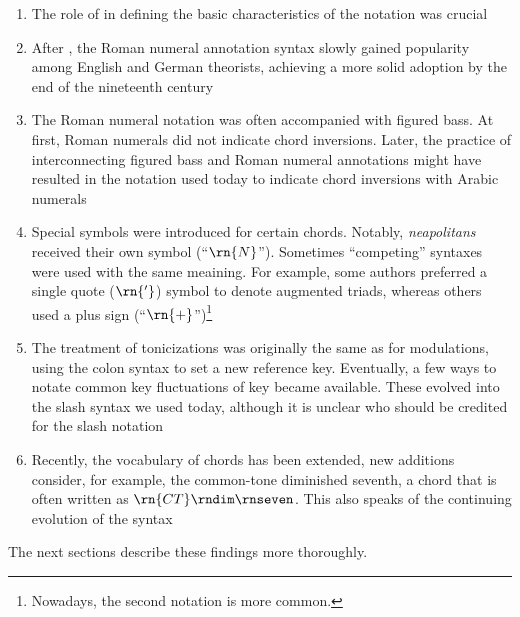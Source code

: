 \begin{enumerate}
    \item The role of \textcite{weber1817versuch} in
    defining the basic characteristics of the notation was
    crucial
    \item After \textcite{weber1817versuch}, the Roman
    numeral annotation syntax slowly gained popularity among
    English and German theorists, achieving a more solid
    adoption by the end of the nineteenth century
    \item The Roman numeral notation was often accompanied
    with figured bass. At first, Roman numerals did not
    indicate chord inversions. Later, the practice of
    interconnecting figured bass and Roman numeral
    annotations might have resulted in the notation used
    today to indicate chord inversions with Arabic numerals
    \item Special symbols were introduced for certain
    chords. Notably, \emph{neapolitans} received their own
    symbol (``$\rn{N}$''). Sometimes ``competing'' syntaxes
    were used with the same meaining. For example, some
    authors preferred a single quote ($\rn{'}$) symbol to
    denote augmented triads, whereas others used a plus sign
    (``$\rn{+}$'')\footnote{Nowadays, the second notation is
    more common.}
    \item The treatment of tonicizations was originally the
    same as for modulations, using the colon syntax to set a
    new reference key. Eventually, a few ways to notate
    common key fluctuations of key became available. These
    evolved into the slash syntax we used today, although it
    is unclear who should be credited for the slash notation
    \item Recently, the vocabulary of chords has been
    extended, new additions consider, for example, the
    common-tone diminished seventh, a chord that is often
    written as $\rn{CT}\rndim\rnseven$. This also speaks of
    the continuing evolution of the syntax
\end{enumerate}

The next sections describe these findings more thoroughly.
